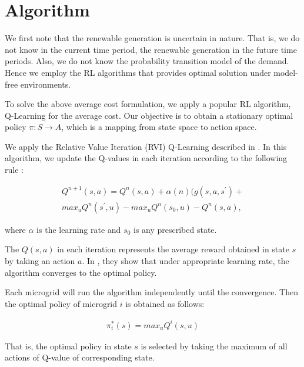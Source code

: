 \section{Algorithm}\label{sec:algo}
We first note that the renewable generation is uncertain in nature. That is, we do not know in the current time period, the renewable generation in the future time periods. Also, we do not know the probability transition model of the demand. Hence we employ the RL algorithms that provides optimal solution under model-free environments.

To solve the above average cost formulation, we apply a popular RL algorithm, Q-Learning for the average cost. Our objective is to obtain a stationary optimal policy $\pi : S \rightarrow A$, which is a mapping from state space to action space.  

We apply the Relative Value Iteration (RVI) Q-Learning described in \cite{avgcost}. In this algorithm, we update the Q-values in each iteration according to the following rule :

\begin{align}
Q^{n+1}(s,a) = Q^{n}(s,a) + \alpha(n)(g(s,a,s^{'}) + \\ max_{u} Q^{n}(s^{'},u) - max_{u} Q^{n}(s_{0},u) - Q^{n}(s,a),
\end{align}

where $\alpha$ is the learning rate and $s_{0}$ is any prescribed state.

The $Q(s,a)$ in each iteration represents the average reward obtained in state $s$ by taking an action $a$. In \cite{avgcost}, they show that under appropriate learning rate, the algorithm converges to the  optimal policy. 

Each microgrid will run the algorithm independently until the convergence. Then the optimal policy of microgrid $i$ is obtained as follows:

\begin{align}
\pi_{i}^{*}(s) = max_{u}Q^{i}(s,u)
\end{align}

That is, the optimal policy in state $s$ is selected by taking the maximum of all actions of Q-value of corresponding state. 

